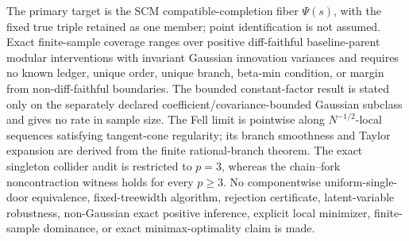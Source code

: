 \documentclass{article}
\begin{document}
The primary target is the SCM compatible-completion fiber \(\Psi(s)\), with the fixed true triple retained as one member; point identification is not assumed. Exact finite-sample coverage ranges over positive diff-faithful baseline-parent modular interventions with invariant Gaussian innovation variances and requires no known ledger, unique order, unique branch, beta-min condition, or margin from non-diff-faithful boundaries. The bounded constant-factor result is stated only on the separately declared coefficient/covariance-bounded Gaussian subclass and gives no rate in sample size. The Fell limit is pointwise along \(N^{-1/2}\)-local sequences satisfying tangent-cone regularity; its branch smoothness and Taylor expansion are derived from the finite rational-branch theorem. The exact singleton collider audit is restricted to \(p=3\), whereas the chain--fork noncontraction witness holds for every \(p\ge3\). No componentwise uniform-single-door equivalence, fixed-treewidth algorithm, rejection certificate, latent-variable robustness, non-Gaussian exact positive inference, explicit local minimizer, finite-sample dominance, or exact minimax-optimality claim is made.
\end{document}

